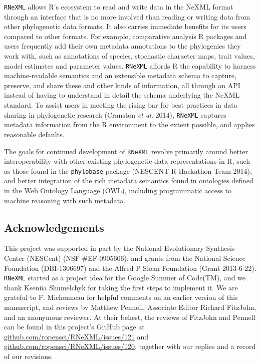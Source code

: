 \documentclass[author-year, review, 11pt]{components/elsarticle} %
\begin{document}
\texttt{RNeXML} allows R's ecosystem to read and write data in the NeXML
format through an interface that is no more involved than reading or
writing data from other phylogenetic data formats. It also carries
immediate benefits for its users compared to other formats. For example,
comparative analysis R packages and users frequently add their own
metadata annotations to the phylogenies they work with, such as
annotations of species, stochastic character maps, trait values, model
estimates and parameter values. \texttt{RNeXML} affords R the capability
to harness machine-readable semantics and an extensible metadata schema
to capture, preserve, and share these and other kinds of information,
all through an API instead of having to understand in detail the schema
underlying the NeXML standard. To assist users in meeting the rising bar
for best practices in data sharing in phylogenetic research (Cranston
\emph{et al.} 2014), \texttt{RNeXML} captures metadata information from
the R environment to the extent possible, and applies reasonable
defaults.

The goals for continued development of \texttt{RNeXML} revolve primarily
around better interoperability with other existing phylogenetic data
representations in R, such as those found in the \texttt{phylobase}
package (NESCENT R Hackathon Team 2014); and better integration of the
rich metadata semantics found in ontologies defined in the Web Ontology
Language (OWL), including programmatic access to machine reasoning with
such metadata.

\subsection{Acknowledgements}\label{acknowledgements}

This project was supported in part by the National Evolutionary
Synthesis Center (NESCent) (NSF \#EF-0905606), and grants from the
National Science Foundation (DBI-1306697) and the Alfred P Sloan
Foundation (Grant 2013-6-22). \texttt{RNeXML} started as a project idea
for the Google Summer of Code(TM), and we thank Kseniia Shumelchyk for
taking the first steps to implement it. We are grateful to F. Michonneau
for helpful comments on an earlier version of this manuscript, and
reviews by Matthew Pennell, Associate Editor Richard FitzJohn, and an
anonymous reviewer. At their behest, the reviews of FitzJohn and Pennell
can be found in this project's GitHub page at
\href{https://github.com/ropensci/RNeXML/issues/121}{github.com/ropensci/RNeXML/issues/121}
and
\href{https://github.com/ropensci/RNeXML/issues/120}{github.com/ropensci/RNeXML/issues/120},
together with our replies and a record of our revisions.
\end{document}
